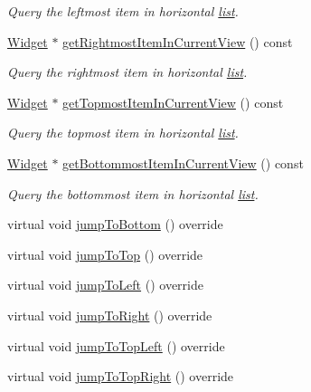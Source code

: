 \begin{DoxyCompactItemize}
\begin{DoxyCompactList}\small\item\em Query the leftmost item in horizontal \hyperlink{protocollist-p}{list}. \end{DoxyCompactList}\item 
\hyperlink{classui_1_1Widget}{Widget} $\ast$ \hyperlink{classui_1_1ListView_ae6bf1a01bfab1bc737bd3a3f33497f6b}{get\+Rightmost\+Item\+In\+Current\+View} () const
\begin{DoxyCompactList}\small\item\em Query the rightmost item in horizontal \hyperlink{protocollist-p}{list}. \end{DoxyCompactList}\item 
\hyperlink{classui_1_1Widget}{Widget} $\ast$ \hyperlink{classui_1_1ListView_ac80f26ac523ac2335d136baaf4eb5fab}{get\+Topmost\+Item\+In\+Current\+View} () const
\begin{DoxyCompactList}\small\item\em Query the topmost item in horizontal \hyperlink{protocollist-p}{list}. \end{DoxyCompactList}\item 
\hyperlink{classui_1_1Widget}{Widget} $\ast$ \hyperlink{classui_1_1ListView_ac3946e3858a88bfdefb9b597e09a581b}{get\+Bottommost\+Item\+In\+Current\+View} () const
\begin{DoxyCompactList}\small\item\em Query the bottommost item in horizontal \hyperlink{protocollist-p}{list}. \end{DoxyCompactList}\item 
virtual void \hyperlink{classui_1_1ListView_aeffa88663d344fbba91e24360458e207}{jump\+To\+Bottom} () override
\item 
virtual void \hyperlink{classui_1_1ListView_ac816b897b329ca67365e8e3f31a5bf18}{jump\+To\+Top} () override
\item 
virtual void \hyperlink{classui_1_1ListView_a141ba140d285c6cc7eba00c9a6dc1efc}{jump\+To\+Left} () override
\item 
virtual void \hyperlink{classui_1_1ListView_aca7e4b44da940fdab188d7b713ada04a}{jump\+To\+Right} () override
\item 
virtual void \hyperlink{classui_1_1ListView_a16fed680b5ef2a65ae0e3a1540e9727e}{jump\+To\+Top\+Left} () override
\item 
virtual void \hyperlink{classui_1_1ListView_a7b90df8fdae3bf08a3714c332f8c2854}{jump\+To\+Top\+Right} () override
\item 

\end{DoxyCompactItemize}
